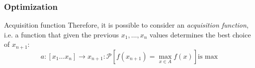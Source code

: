 \begin{frame}
    \frametitle{Optimization}
    \begin{exampleblock}{Acquisition function}
        Therefore, it is possible to consider an \emph{acquisition function}, i.e. a function that given the previous $x_1, \ldots, x_n$ values determines the best choice of $x_{n+1}$:
        \begin{equation}
            a \colon \left[x_1 \ldots x_n\right] \rightarrow x_{n+1} \colon \mathcal{P}\left[f(x_{n+1}) = \max\limits_{x \in A} f\left(x\right)\right] \text{is max}
        \end{equation}
    \end{exampleblock}
\end{frame}